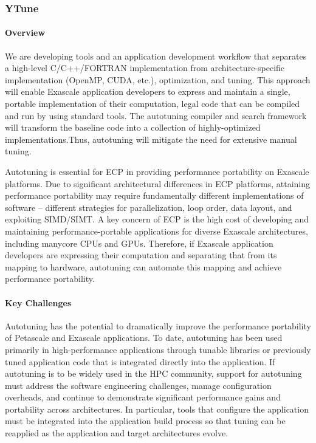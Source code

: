 \subsubsection{ YTune} 

\paragraph{Overview} 

We are developing tools and an application development workflow that separates a high-level C/C++/FORTRAN implementation from architecture-specific implementation (OpenMP, CUDA, etc.), optimization, and  tuning.   This  approach 
will enable Exascale application  developers to express and  maintain a    single, portable implementation of their computation, legal code that can be compiled and run by using standard tools.   The autotuning compiler and search framework will transform the baseline code into a   collection of highly-optimized implementations.Thus, autotuning will mitigate the need for extensive manual tuning. 

Autotuning is essential for ECP in providing performance portability on Exascale platforms.  Due to significant architectural differences in ECP platforms, attaining performance portability may  require fundamentally different  implementations of software -- different strategies for parallelization, loop order,  data layout, and exploiting SIMD/SIMT.  A    key concern of ECP is the high cost of developing  and maintaining performance-portable applications for  diverse Exascale architectures, including manycore CPUs and GPUs.  Therefore, if   Exascale application developers are expressing their computation and separating that from   its mapping to hardware, autotuning can automate this mapping and achieve performance portability.

\paragraph{Key  Challenges}
Autotuning has the potential to dramatically improve the performance portability of Petascale and Exascale applications.  To date, autotuning has been used primarily in high-performance applications through tunable libraries or previously tuned application code that is integrated directly into the application.  
If autotuning is to be widely used in the HPC community, 
support for autotuning must address the software engineering challenges, manage configuration overheads, and continue to demonstrate significant performance gains and portability across architectures.
In particular, tools that configure the application must be integrated into the application build process so that tuning can be reapplied as the application and target architectures evolve.

